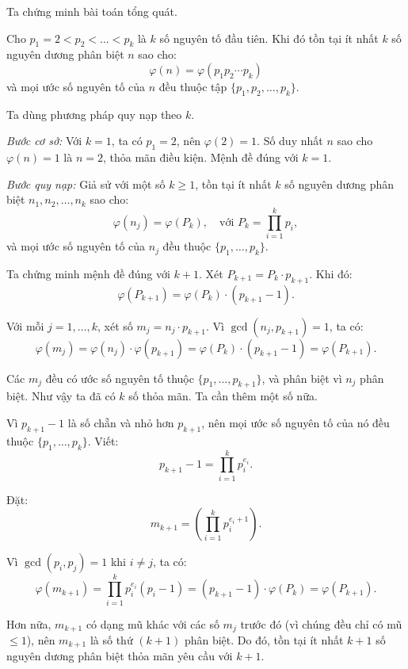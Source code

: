 \documentclass[../09-contruction-methods.tex]{subfiles}
\begin{document}
\begin{soln}
    Ta chứng minh bài toán tổng quát.
    \begin{claim*}
		Cho \( p_1 = 2 < p_2 < \dots < p_k \) là \( k \) số nguyên tố đầu tiên. Khi đó tồn tại ít nhất \( k \) số nguyên dương phân biệt \( n \) sao cho:
		\[
			\varphi(n) = \varphi(p_1p_2\cdots p_k)
		\]
		và mọi ước số nguyên tố của \( n \) đều thuộc tập \( \{p_1, p_2, \dots, p_k\} \).
    \end{claim*}
    \begin{subproof}
		Ta dùng phương pháp quy nạp theo \( k \).
		
		\textit{Bước cơ sở:} Với \( k = 1 \), ta có \( p_1 = 2 \), nên \( \varphi(2) = 1 \).  
		Số duy nhất \( n \) sao cho \( \varphi(n) = 1 \) là \( n = 2 \), thỏa mãn điều kiện. Mệnh đề đúng với \( k = 1 \).
		
		\textit{Bước quy nạp:} Giả sử với một số \( k \geq 1 \), tồn tại ít nhất \( k \) số nguyên dương phân biệt \( n_1, n_2, \dots, n_k \) sao cho:
		\[
			\varphi(n_j) = \varphi(P_k), \quad \text{với } P_k = \prod_{i=1}^k p_i,
		\]
		và mọi ước số nguyên tố của \( n_j \) đều thuộc \( \{p_1, \dots, p_k\} \).
		
		Ta chứng minh mệnh đề đúng với \( k + 1 \).
		Xét \( P_{k+1} = P_k \cdot p_{k+1} \). Khi đó:
		\[
			\varphi(P_{k+1}) = \varphi(P_k) \cdot (p_{k+1} - 1).
		\]
		
		Với mỗi \( j = 1, \dots, k \), xét số \( m_j = n_j \cdot p_{k+1} \).  
		Vì \( \gcd(n_j, p_{k+1}) = 1 \), ta có:
		\[
			\varphi(m_j) = \varphi(n_j) \cdot \varphi(p_{k+1}) = \varphi(P_k) \cdot (p_{k+1} - 1) = \varphi(P_{k+1}).
		\]
		
		Các \( m_j \) đều có ước số nguyên tố thuộc \( \{p_1, \dots, p_{k+1}\} \), và phân biệt vì \( n_j \) phân biệt.
		Như vậy ta đã có \( k \) số thỏa mãn. Ta cần thêm một số nữa.
		
		Vì \( p_{k+1} - 1 \) là số chẵn và nhỏ hơn \( p_{k+1} \), nên mọi ước số nguyên tố của nó đều thuộc \( \{p_1, \dots, p_k\} \).  
		Viết:
		\[
			p_{k+1} - 1 = \prod_{i=1}^k p_i^{e_i}.
		\]
		
		Đặt:
		\[
			m_{k+1} = \left( \prod_{i=1}^k p_i^{e_i + 1} \right).
		\]
		
		Vì \( \gcd(p_i, p_j) = 1 \) khi \( i \ne j \), ta có:
		\[
			\varphi(m_{k+1}) = \prod_{i=1}^k p_i^{e_i}(p_i - 1) = (p_{k+1} - 1) \cdot \varphi(P_k) = \varphi(P_{k+1}).
		\]
		
		Hơn nữa, \( m_{k+1} \) có dạng mũ khác với các số \( m_j \) trước đó (vì chúng đều chỉ có mũ \( \leq 1 \)), nên \( m_{k+1} \) là số thứ \( (k+1) \) phân biệt.
		Do đó, tồn tại ít nhất \( k+1 \) số nguyên dương phân biệt thỏa mãn yêu cầu với \( k+1 \).
    \end{subproof}
\end{soln}

\end{document}
